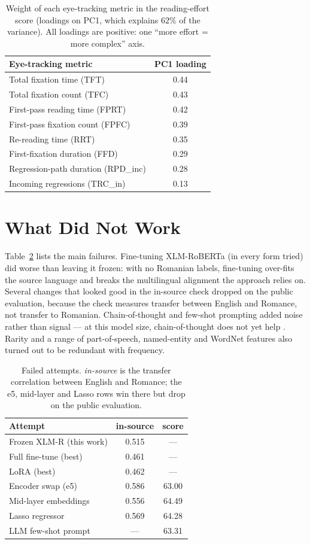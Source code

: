 \documentclass[11pt]{article}
\begin{document}
\begin{table}[tbp]
\centering\small
\begin{tabular}{lc}
\toprule
\textbf{Eye-tracking metric} & \textbf{PC1 loading} \\
\midrule
Total fixation time (TFT) & 0.44 \\
Total fixation count (TFC) & 0.43 \\
First-pass reading time (FPRT) & 0.42 \\
First-pass fixation count (FPFC) & 0.39 \\
Re-reading time (RRT) & 0.35 \\
First-fixation duration (FFD) & 0.29 \\
Regression-path duration (RPD\_inc) & 0.28 \\
Incoming regressions (TRC\_in) & 0.13 \\
\bottomrule
\end{tabular}
\caption{Weight of each eye-tracking metric in the reading-effort score (loadings on PC1, which explains $62\%$ of
the variance). All loadings are positive: one ``more effort = more complex'' axis.}
\label{tab:pca}
\end{table}

\section{What Did Not Work}
\label{sec:negative}
Table~\ref{tab:fail} lists the main failures. Fine-tuning XLM-RoBERTa (in every form tried) did worse than leaving
it frozen: with no Romanian labels, fine-tuning over-fits the source language and breaks the multilingual alignment
the approach relies on. Several changes that looked good in the in-source check dropped on the public evaluation,
because the check measures transfer between English and Romance, not transfer to Romanian. Chain-of-thought and
few-shot prompting added noise rather than signal --- at this model size, chain-of-thought does not yet help
\citep{wei2022cot}. Rarity and a range of part-of-speech, named-entity and WordNet features also turned out to be
redundant with frequency.

\begin{table}[tbp]
\centering\small
\begin{tabular}{lcc}
\toprule
\textbf{Attempt} & \textbf{in-source} & \textbf{score} \\
\midrule
Frozen XLM-R (this work) & 0.515 & --- \\
Full fine-tune (best) & 0.461 & --- \\
LoRA (best) & 0.462 & --- \\
Encoder swap (e5) & 0.586 & 63.00 \\
Mid-layer embeddings & 0.556 & 64.49 \\
Lasso regressor & 0.569 & 64.28 \\
LLM few-shot prompt & --- & 63.31 \\
\bottomrule
\end{tabular}
\caption{Failed attempts. \emph{in-source} is the transfer correlation between English and Romance; the e5,
mid-layer and Lasso rows win there but drop on the public evaluation.}
\label{tab:fail}
\end{table}
\end{document}
